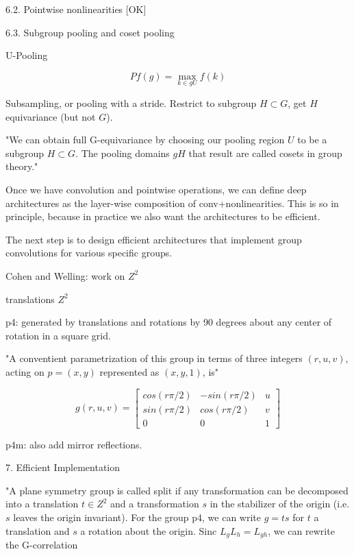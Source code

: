 \documentclass[english]{article}
\begin{document}
6.2. Pointwise nonlinearities [OK]

6.3. Subgroup pooling and coset pooling

U-Pooling 

$$Pf(g) = \max_{k\in gU} f(k)$$

Subsampling, or pooling with a stride. Restrict to subgroup $H \subset G$, get $H$ equivariance (but not $G$). 


"We can obtain full G-equivariance by choosing our pooling
region $U$ to be a subgroup $H \subset G$. The pooling domains
$gH$ that result are called cosets in group theory."


\item 
Once we have convolution and pointwise operations, we can define deep architectures as the layer-wise composition of conv+nonlinearities. This is so in principle, because in practice we also want the architectures to be efficient.

The next step is to design efficient architectures that implement group convolutions for various specific groups. 


\item Cohen and Welling: work on $Z^2$

\benum 
\item
translations $Z^2$
\item

p4: generated by translations and rotations by 90 degrees about any center of rotation in a square grid. 

"A conventient parametrization of this group in terms of three integers $(r,u,v)$, acting on $p=(x,y)$ represented as $(x,y,1)$, is"

$$
g(r,u,v)
= \begin{bmatrix} 
cos(r\pi/2) &-sin(r\pi/2) & u \\ 
sin(r\pi/2) & cos(r\pi/2)& v \\ 
0 &0 &1 
\end{bmatrix}
$$
\item p4m: also add mirror reflections. 

\eenum 

\item 7. Efficient Implementation

"A plane symmetry group is called split if any transformation can be decomposed into a translation $t \in Z^2$ and a transformation $s$ in the stabilizer of the origin (i.e. $s$ leaves the origin invariant). For the group p4, we can write $g = ts$ for $t$ a translation and $s$ a rotation about the origin. Sinc $L_g L_h = L_{gh}$, we can rewrite the G-correlation 
\end{document}
